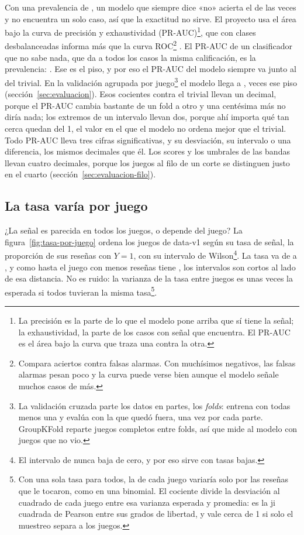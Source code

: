 Con una prevalencia de \cifraPrevalenciaEntrenamientoPorResena{}, un modelo que siempre dice «no»
acierta el \cifraExactitudTrivialPorResena{} de las veces y no encuentra un solo caso, así que la
exactitud no sirve. El proyecto usa el área bajo la curva de precisión y exhaustividad
(PR-AUC)\footnote{La precisión es la parte de lo que el modelo pone arriba que sí tiene la señal; la
exhaustividad, la parte de los casos con señal que encuentra. El PR-AUC es el área bajo la curva
que traza una contra la otra.}, que con clases desbalanceadas informa más que la curva
ROC\footnote{Compara aciertos contra falsas alarmas. Con muchísimos negativos, las falsas alarmas
pesan poco y la curva puede verse bien aunque el modelo señale muchos casos de más.}
\parencite{saito2015,davis2006}. El PR-AUC de un clasificador que no sabe nada, que da a todos los
casos la misma calificación, es la prevalencia: \cifraPRAUCTrivial{}. Ese es el piso, y por eso el
PR-AUC del modelo siempre va junto al del trivial. En la validación agrupada por
juego\footnote{La validación cruzada parte los datos en partes, los \emph{folds}: entrena con todas
menos una y evalúa con la que quedó fuera, una vez por cada parte. GroupKFold reparte juegos
completos entre folds, así que mide al modelo con juegos que no vio.} el modelo llega a \cifraPRAUCModelo{}, \cifraPRAUCCociente{} veces
ese piso (sección~\ref{sec:evaluacion}). Esos cocientes contra el trivial llevan un decimal, porque
el PR-AUC cambia bastante de un fold a otro y una centésima más no diría nada; los extremos de un
intervalo llevan dos, porque ahí importa qué tan cerca quedan del 1, el valor en el que el modelo no
ordena mejor que el trivial. Todo PR-AUC lleva tres cifras significativas, y su desviación, su
intervalo o una diferencia, los mismos decimales que él. Los scores y los umbrales de las bandas
llevan cuatro decimales, porque los juegos al filo de un corte se distinguen justo en el cuarto
(sección~\ref{sec:evaluacion-filo}).

\subsection{La tasa varía por juego}\label{sec:exploracion-juego}

¿La señal es parecida en todos los juegos, o depende del juego? La
figura~\ref{fig:tasa-por-juego} ordena los \cifraJuegosEntrenamiento{} juegos de data-v1 según su
tasa de señal, la proporción de sus reseñas con $Y = 1$, con su intervalo de Wilson\footnote{El
intervalo de \textcite{wilson1927} nunca baja de cero, y por eso sirve con tasas bajas.}. La tasa va de
\cifraTasaJuegoMinPorResena{} a \cifraTasaJuegoMaxPorResena{}, y como hasta el juego con menos
reseñas tiene \cifraResenasJuegoMin{}, los intervalos son cortos al lado de esa distancia. No es
ruido: la varianza de la tasa entre juegos es unas \cifraSobredispersion{} veces la esperada si
todos tuvieran la misma tasa\footnote{Con una sola tasa para todos, la de cada juego variaría solo
por las reseñas que le tocaron, como en una binomial. El cociente divide la desviación al cuadrado
de cada juego entre esa varianza esperada y promedia: es la ji cuadrada de Pearson entre sus grados
de libertad, y vale cerca de 1 si solo el muestreo separa a los juegos.}.


